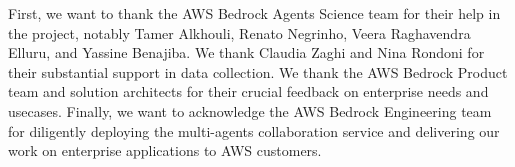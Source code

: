 \begin{ack}
First, we want to thank the AWS Bedrock Agents Science team for their help in the project, notably Tamer Alkhouli, Renato Negrinho, Veera Raghavendra Elluru, and Yassine Benajiba. We thank Claudia Zaghi and Nina Rondoni for their  substantial support in data collection. We thank the AWS Bedrock Product team and solution architects for their crucial feedback on enterprise needs and usecases. Finally, we want to acknowledge the AWS Bedrock Engineering team for diligently deploying the multi-agents collaboration service and delivering our work on enterprise applications to AWS customers. 
\end{ack}